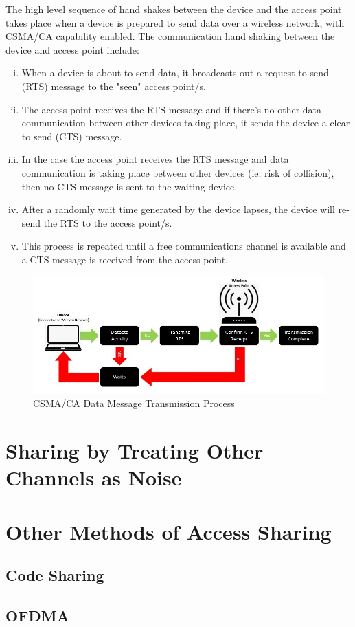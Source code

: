 The high level sequence of hand shakes between the device and the access point takes place when a device is  prepared to send data over a wireless network, with CSMA/CA capability enabled. The communication hand shaking between the device and access point include:

\begin{enumerate}[(i)]

\item When a device is about to send data, it broadcasts out a request to send (RTS) message to the "seen" access point/s.
\item The access point receives the RTS message and if there's no other data communication between other devices taking place, it sends the device a clear to send (CTS) message.
\item In the case the access point receives the RTS message and data communication is taking place between other devices (ie; risk of collision), then no CTS message is sent to the waiting device.
\item After a randomly wait time generated by the device lapses, the device will re-send the RTS to the access point/s.
\item This process is repeated until a free communications channel is available and a CTS message is received from the access point.

\end{enumerate}

\begin{figure}
\centering
	\includegraphics[width=12cm]{CSMA_CA}
	\caption{CSMA/CA Data Message Transmission Process}
	\label{CSMA_CA}
\end{figure}


\section{Sharing by Treating Other Channels as Noise}

\section{Other Methods of Access Sharing}

\subsection{Code Sharing}

\subsection{OFDMA}
